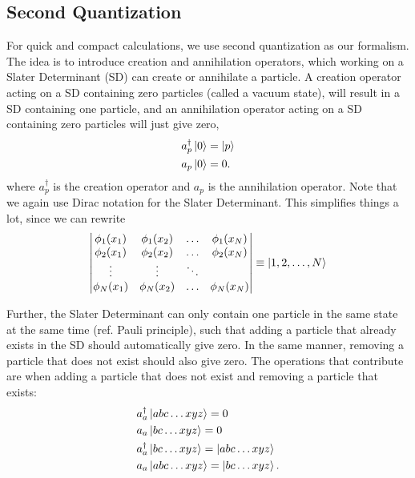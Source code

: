\subsection{Second Quantization}
For quick and compact calculations, we use second quantization as our formalism. The idea is to introduce creation and annihilation operators, which working on a Slater Determinant (SD) can create or annihilate a particle. A creation operator acting on a SD containing zero particles (called a vacuum state), will result in a SD containing one particle, and an annihilation operator acting on a SD containing zero particles will just give zero,
\begin{align}
	a_{p}^{\dagger}\ket{0}&=\ket{p}\\
	a_{p}\ket{0}&=0.
\end{align}
where $a_p^{\dagger}$ is the creation operator and $a_p$ is the annihilation operator. Note that we again use Dirac notation for the Slater Determinant. This simplifies things a lot, since we can rewrite
\begin{equation}
\begin{vmatrix}
\phi_1(x_1) & \phi_1(x_2) & \hdots & \phi_1(x_N) \\
\phi_2(x_1) & \phi_2(x_2) & \hdots & \phi_2(x_N) \\
\vdots & \vdots & \ddots &\\
\phi_N(x_1) & \phi_N(x_2) & \hdots & \phi_N(x_N)
\end{vmatrix}
\equiv \ket{1,2,\hdots,N}
\end{equation}

Further, the Slater Determinant can only contain one particle in the same state at the same time (ref. Pauli principle), such that adding a particle that already exists in the SD should automatically give zero. In the same manner, removing a particle that does not exist should also give zero. The operations that contribute are when adding a particle that does not exist and removing a particle that exists:
\begin{align}
	&a_{a}^{\dagger}\ket{abc\hdots xyz}=0\\
	&a_{a}\ket{bc\hdots xyz}=0\\
	&a_{a}^{\dagger}\ket{bc\hdots xyz}=\ket{abc\hdots xyz}\\
	&a_{a}\ket{abc\hdots xyz}=\ket{bc\hdots xyz}.
\end{align}

